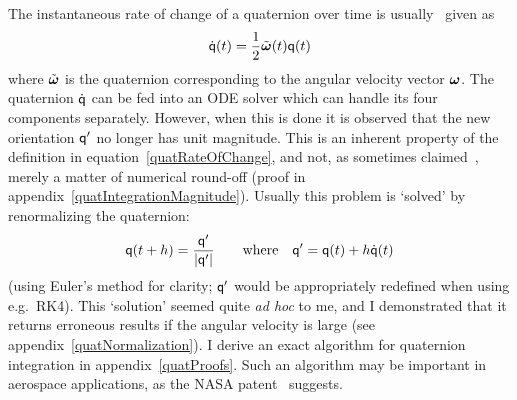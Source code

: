The instantaneous rate of change of a quaternion  over time is
usually~\cite{BaraffWitkin:97,Eberly:04,Saunders:PhD} given as
\begin{equation}
\label{quatRateOfChange}
\dot{\q{q}}(t) = \frac{1}{2}\tilde{\ve{\omega}}(t)\q{q}(t)
\end{equation}
where $\tilde{\ve{\omega}}$ is the quaternion corresponding to the angular velocity
vector $\ve{\omega}$. The quaternion $\dot{\mathsf{q}}$ can be fed into an ODE solver which can handle
its four components separately. However, when this is done it is observed that the new orientation
$\mathsf{q}'$ no longer has unit magnitude. This is an inherent property of the definition in
equation~\ref{quatRateOfChange}, and not, as sometimes claimed~\cite{Eberly:04}, merely a matter
of numerical round-off (proof in appendix~\ref{quatIntegrationMagnitude}). Usually this problem
is `solved' by renormalizing the quaternion:
\begin{equation}
\mathsf{q}(t + h) = \frac{\mathsf{q}'}{|\mathsf{q}'|} \quad\quad\mathrm{where}\quad
    \mathsf{q}' = \mathsf{q}(t) + h\dot{\mathsf{q}}(t)
\end{equation}
(using Euler's method for clarity; $\mathsf{q}'$ would be appropriately redefined when using e.g.\ RK4).
This `solution' seemed quite \textsl{ad hoc} to me, and I demonstrated that it returns
erroneous results if the angular velocity is large (see appendix~\ref{quatNormalization}).
I derive an exact algorithm for quaternion integration in appendix~\ref{quatProofs}. Such
an algorithm may be important in aerospace applications, as the NASA patent~\cite{NASA:00}
suggests.
